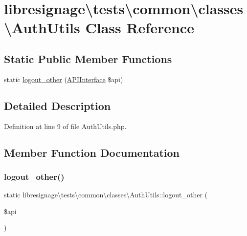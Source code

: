 \hypertarget{classlibresignage_1_1tests_1_1common_1_1classes_1_1AuthUtils}{}\section{libresignage\textbackslash{}tests\textbackslash{}common\textbackslash{}classes\textbackslash{}Auth\+Utils Class Reference}
\label{classlibresignage_1_1tests_1_1common_1_1classes_1_1AuthUtils}
\subsection*{Static Public Member Functions}
\begin{DoxyCompactItemize}
\item 
static \hyperlink{classlibresignage_1_1tests_1_1common_1_1classes_1_1AuthUtils_a3f47f6b792079c01b893fa1f4fcec158}{logout\+\_\+other} (\hyperlink{classlibresignage_1_1tests_1_1common_1_1classes_1_1APIInterface}{A\+P\+I\+Interface} \$api)
\end{DoxyCompactItemize}


\subsection{Detailed Description}


Definition at line 9 of file Auth\+Utils.\+php.



\subsection{Member Function Documentation}
\mbox{\label{classlibresignage_1_1tests_1_1common_1_1classes_1_1AuthUtils_a3f47f6b792079c01b893fa1f4fcec158}} 
\subsubsection{\texorpdfstring{logout\+\_\+other()}{logout\_other()}}
{\footnotesize\ttfamily static libresignage\textbackslash{}tests\textbackslash{}common\textbackslash{}classes\textbackslash{}\+Auth\+Utils\+::logout\+\_\+other (\begin{DoxyParamCaption}\item[{\hyperlink{classlibresignage_1_1tests_1_1common_1_1classes_1_1APIInterface}{A\+P\+I\+Interface}}]{\$api }\end{DoxyParamCaption})\hspace{0.3cm}{\ttfamily [static]}}

